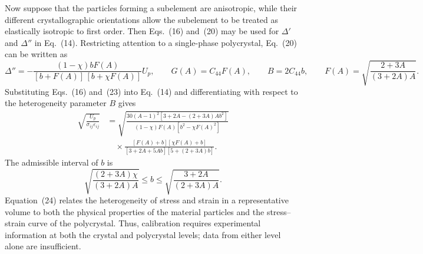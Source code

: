 \documentclass[11pt,a4paper]{article}
\numberwithin{equation}{section}
\begin{document}
Now suppose that the particles forming a subelement are anisotropic, while their different crystallographic orientations allow the subelement to be treated as elastically isotropic to first order. Then Eqs.~(16) and~(20) may be used for $\Delta'$ and $\Delta''$ in Eq.~(14). Restricting attention to a single-phase polycrystal, Eq.~(20) can be written as
\begin{equation}
 \Delta''
 =-\frac{(1-\chi)bF(A)}{[b+F(A)]\,[b+\chi F(A)]}U_p,
 \qquad
 G(A)=C_{44}F(A),
 \qquad
 B=2C_{44}b,
 \qquad
 F(A)=\sqrt{\frac{2+3A}{(3+2A)A}}.
\end{equation}
Substituting Eqs.~(16) and~(23) into Eq.~(14) and differentiating with respect to the heterogeneity parameter $B$ gives
\begin{equation}
\begin{aligned}
 \sqrt{\frac{U_p}{\sigma_{ij}\varepsilon_{ij}}}
 &={}
 \sqrt{
 \frac{30(A-1)^2[3+2A-(2+3A)Ab^2]}
 {(1-\chi)F(A)[b^2-\chi F(A)^2]}}
 \\
 &\quad\times
 \frac{[F(A)+b][\chi F(A)+b]}
 {[3+2A+5Ab][5+(2+3A)b]}.
\end{aligned}
\end{equation}
The admissible interval of $b$ is
\begin{equation}
 \sqrt{\frac{(2+3A)\chi}{(3+2A)A}}
 \leq b\leq
 \sqrt{\frac{3+2A}{(2+3A)A}}.
\end{equation}
Equation~(24) relates the heterogeneity of stress and strain in a representative volume to both the physical properties of the material particles and the stress--strain curve of the polycrystal. Thus, calibration requires experimental information at both the crystal and polycrystal levels; data from either level alone are insufficient.
\end{document}
